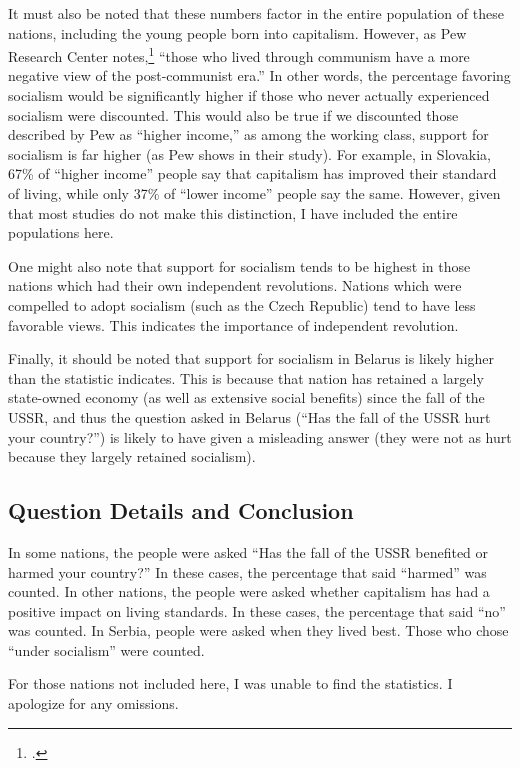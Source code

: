 It must also be noted that these numbers factor in the entire population of these nations, including the young people born into capitalism.
However, as Pew Research Center notes,\footcite[p. 29]{pew} ``those who lived through communism have a more negative view of the post-communist era.''
In other words, the percentage favoring socialism would be significantly higher if those who never actually experienced socialism were discounted.
This would also be true if we discounted those described by Pew as ``higher income,'' as among the working class, support for socialism is far higher (as Pew shows in their study).
For example, in Slovakia, 67\% of ``higher income'' people say that capitalism has improved their standard of living, while only 37\% of ``lower income'' people say the same.
However, given that most studies do not make this distinction, I have included the entire populations here.

One might also note that support for socialism tends to be highest in those nations which had their own independent revolutions.
Nations which were compelled to adopt socialism (such as the Czech Republic) tend to have less favorable views.
This indicates the importance of independent revolution.

Finally, it should be noted that support for socialism in Belarus is likely higher than the statistic indicates.
This is because that nation has retained a largely state-owned economy (as well as extensive social benefits) since the fall of the USSR, and thus the question asked in Belarus (``Has the fall of the USSR hurt your country?'') is likely to have given a misleading answer (they were not as hurt because they largely retained socialism).

\subsection*{Question Details and Conclusion}

In some nations, the people were asked ``Has the fall of the USSR benefited or harmed your country?'' In these cases, the percentage that said ``harmed'' was counted. In other nations, the people were asked whether capitalism has had a positive impact on living standards. In these cases, the percentage that said ``no'' was counted. In Serbia, people were asked when they lived best. Those who chose ``under socialism'' were counted.

For those nations not included here, I was unable to find the statistics. I apologize for any omissions.
\nocite{*}
